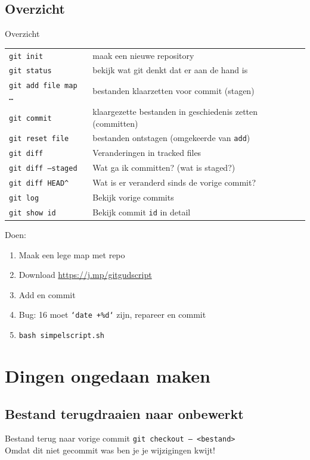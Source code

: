 \subsection{Overzicht}
\begin{frame}{Overzicht}
	{ \footnotesize
	\begin{tabular}{ll}
		\texttt{git init}					& maak een nieuwe repository \\
		\texttt{git status} 				& bekijk wat git denkt dat er aan de hand is \\
		\texttt{git add file map \ldots}	& bestanden klaarzetten voor commit (stagen)	\\
		\texttt{git commit} 				& klaargezette bestanden in geschiedenis zetten (committen)\\
		\texttt{git reset file}		    	& bestanden ontstagen (omgekeerde van \texttt{add})	\\
		\hline
		\texttt{git diff}					& Veranderingen in tracked files					\\
		\texttt{git diff --staged}			& Wat ga ik committen? (wat is staged?)				\\
		\texttt{git diff HEAD\^}			& Wat is er veranderd sinds de vorige commit?		\\
		\hline
		\texttt{git log}					& Bekijk vorige commits								\\
		\texttt{git show id}				& Bekijk commit \texttt{id} in detail
	\end{tabular}
	}
	Doen:
	\begin{enumerate}
		\item Maak een lege map met repo
		\item Download \url{https://j.mp/gitgudscript}
		\item Add en commit
		\item Bug: 16 moet \texttt{`date +\%d`} zijn, repareer en commit
		\item \texttt{bash simpelscript.sh}
	\end{enumerate}
\end{frame}

\section{Dingen ongedaan maken}

\subsection{Bestand terugdraaien naar onbewerkt}
\begin{frame}{Bestand terug naar vorige commit}
	\texttt{git checkout -- <bestand>} \\
	\alert{Omdat dit niet gecommit was ben je je wijzigingen kwijt!}
\end{frame}

